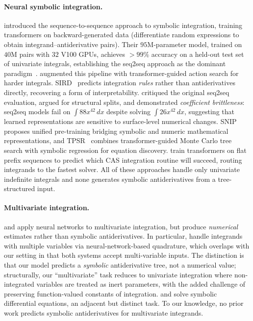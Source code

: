 \documentclass{article}
\begin{document}
\paragraph{Neural symbolic integration.}
\citet{lample2020deep} introduced the sequence-to-sequence approach to
symbolic integration, training transformers on backward-generated data
(differentiate random expressions to obtain integrand--antiderivative
pairs). Their $95$M-parameter model, trained on $40$M pairs with $32$
V100 GPUs, achieves $>\!99\%$ accuracy on a held-out test set of
univariate integrals, establishing the seq2seq approach as the dominant
paradigm~\citep{vaswani2017attention}.
\citet{alphaintegrator2024} augmented this pipeline with
transformer-guided action search for harder integrals.
SIRD~\citep{sird2023} predicts integration \emph{rules} rather than
antiderivatives directly, recovering a form of interpretability.
\citet{davis2019use} critiqued the original seq2seq evaluation, argued
for structural splits, and demonstrated \emph{coefficient brittleness}:
seq2seq models fail on $\int 88x^{42}\,dx$ despite solving
$\int 26x^{42}\,dx$, suggesting that learned representations are
sensitive to surface-level numerical changes.
SNIP~\citep{meidani2024snip} proposes unified pre-training bridging
symbolic and numeric mathematical representations, and
TPSR~\citep{shojaee2023tpsr} combines transformer-guided Monte Carlo
tree search with symbolic regression for equation discovery.
\citet{barket2024transformers} train transformers on flat prefix
sequences to predict which CAS integration routine will succeed,
routing integrands to the fastest solver.
All of these approaches handle only univariate indefinite integrals
and none generates symbolic antiderivatives from a tree-structured
input.

\paragraph{Multivariate integration.}
\citet{maitre2023numerical} and \citet{rubab2025neural} apply neural
networks to multivariate integration, but produce \emph{numerical}
estimates rather than symbolic antiderivatives. In particular,
\citet{rubab2025neural} handle integrands with multiple variables via
neural-network-based quadrature, which overlaps with our setting in that
both systems accept multi-variable inputs. The distinction is that our
model predicts a \emph{symbolic} antiderivative tree, not a numerical
value; structurally, our ``multivariate'' task reduces to univariate
integration where non-integrated variables are treated as inert
parameters, with the added challenge of preserving function-valued
constants of integration. \citet{oikonomou2025neurosymbolic} and
\citet{wei2024closedform} solve symbolic differential equations, an
adjacent but distinct task.
To our knowledge, no prior work predicts symbolic antiderivatives for
multivariate integrands.
\end{document}
